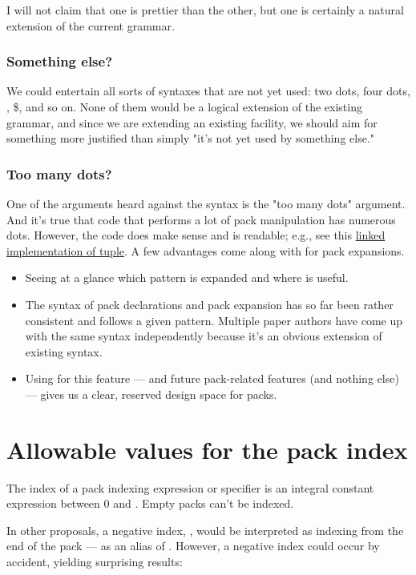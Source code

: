 \documentclass{wg21}
\begin{document}
I will not claim that one is prettier than the other, but one is certainly a natural extension of the current grammar.\subsubsection{Something else?}

We could entertain all sorts of syntaxes that are not yet used: two dots, four dots, \tcode{!},  \$, and so on.
None of them would be a logical extension of the existing grammar, and since we are extending an existing facility, we should aim for something more justified than simply "it's not yet used by something else."

\subsubsection{Too many dots?}

One of the arguments heard against the  syntax is the "too many dots" argument.
And it's true that code that performs a lot of pack manipulation has numerous dots.
However, the code does make sense and is readable; e.g., see this \href{https://github.com/seanbaxter/circle/blob/master/tuple/tuple.hxx}{linked implementation of tuple}.
A few advantages come along with  for pack expansions.
\begin{itemize}
\item Seeing at a glance which pattern is expanded and where is useful.
\item The syntax of pack declarations and pack expansion has so far been rather consistent and follows a given pattern. Multiple paper authors
 have come up with the same syntax independently because it's an obvious extension of existing syntax.
\item Using  for this feature --- and future pack-related features (and nothing else) --- gives us a clear, reserved design space for packs.
\end{itemize}

\section{Allowable values for the pack index}

The index of a pack indexing expression or specifier is an integral constant expression between 0 and .
Empty packs can't be indexed.

In other proposals, a negative index, , would be interpreted as
indexing from the end of the pack --- as an alias of .
However, a negative index could occur by accident, yielding surprising results:
\end{document}
